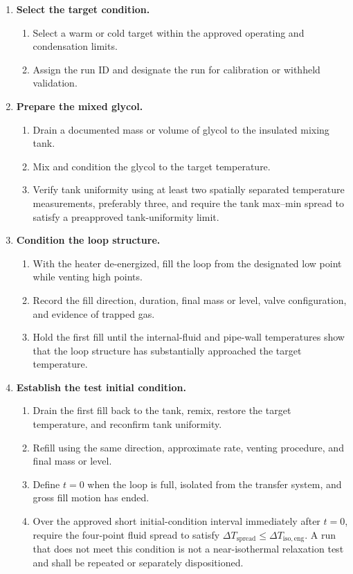 \documentclass[11pt]{article}
\begin{document}
\begin{enumerate}
    \item \textbf{Select the target condition.}
    \begin{enumerate}
        \item Select a warm or cold target within the approved operating and condensation limits.
        \item Assign the run ID and designate the run for calibration or withheld validation.
    \end{enumerate}

    \item \textbf{Prepare the mixed glycol.}
    \begin{enumerate}
        \item Drain a documented mass or volume of glycol to the insulated mixing tank.
        \item Mix and condition the glycol to the target temperature.
        \item Verify tank uniformity using at least two spatially separated temperature measurements, preferably three, and require the tank max--min spread to satisfy a preapproved tank-uniformity limit.
    \end{enumerate}

    \item \textbf{Condition the loop structure.}
    \begin{enumerate}
        \item With the heater de-energized, fill the loop from the designated low point while venting high points.
        \item Record the fill direction, duration, final mass or level, valve configuration, and evidence of trapped gas.
        \item Hold the first fill until the internal-fluid and pipe-wall temperatures show that the loop structure has substantially approached the target temperature.
    \end{enumerate}

    \item \textbf{Establish the test initial condition.}
    \begin{enumerate}
        \item Drain the first fill back to the tank, remix, restore the target temperature, and reconfirm tank uniformity.
        \item Refill using the same direction, approximate rate, venting procedure, and final mass or level.
        \item Define $t=0$ when the loop is full, isolated from the transfer system, and gross fill motion has ended.
        \item Over the approved short initial-condition interval immediately after $t=0$, require the four-point fluid spread to satisfy $\Delta T_{\mathrm{spread}}\leq\Delta T_{\mathrm{iso,eng}}$. A run that does not meet this condition is not a near-isothermal relaxation test and shall be repeated or separately dispositioned.
    \end{enumerate}


\end{enumerate}
\end{document}
